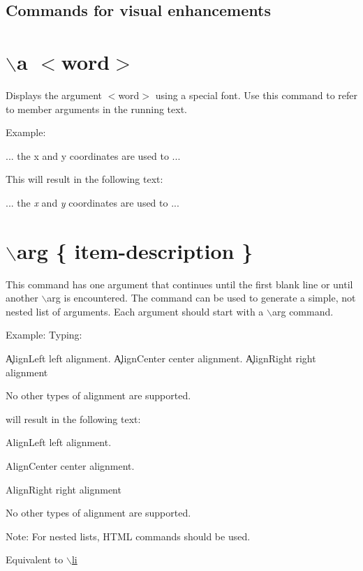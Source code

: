  \subsection*{ Commands for visual enhancements  }

\hypertarget{commands_cmda}{}\section{$\backslash$a $<$word$>$}\label{commands_cmda}
 Displays the argument $<$word$>$ using a special font. Use this command to refer to member arguments in the running text.

\begin{DoxyParagraph}{Example:}
\begin{DoxyVerb}
  ... the \a x and \a y coordinates are used to ...
  \end{DoxyVerb}
 This will result in the following text:\par
\par
 ... the {\itshape x\/} and {\itshape y\/} coordinates are used to ...
\end{DoxyParagraph}


 \hypertarget{commands_cmdarg}{}\section{$\backslash$arg \{ item-\/description \}}\label{commands_cmdarg}
 This command has one argument that continues until the first blank line or until another $\backslash$arg is encountered. The command can be used to generate a simple, not nested list of arguments. Each argument should start with a $\backslash$arg command.

\begin{DoxyParagraph}{Example:}
Typing: \begin{DoxyVerb}
  \arg \c AlignLeft left alignment.
  \arg \c AlignCenter center alignment.
  \arg \c AlignRight right alignment
  
  No other types of alignment are supported.
  \end{DoxyVerb}
 will result in the following text:\par
\par
 
\begin{DoxyItemize}
\item {\ttfamily AlignLeft} left alignment. 
\item {\ttfamily AlignCenter} center alignment. 
\item {\ttfamily AlignRight} right alignment 
\end{DoxyItemize}\par
 No other types of alignment are supported.
\end{DoxyParagraph}
\begin{DoxyParagraph}{Note:}
For nested lists, HTML commands should be used.
\end{DoxyParagraph}
Equivalent to \hyperlink{commands_cmdli}{$\backslash$li}



